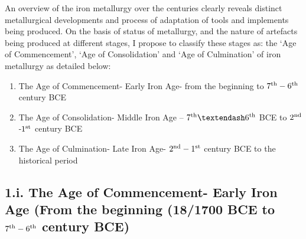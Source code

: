  An overview of the iron metallurgy over the centuries clearly reveals distinct metallurgical developments and process of adaptation of tools and implements being produced. On the basis of status of metallurgy, and the nature of artefacts being produced at different stages, I propose to classify these stages as: the ‘Age of Commencement’, ‘Age of Consolidation’ and ‘Age of Culmination’ of iron metallurgy as detailed below: 
\begin{enumerate}
\item The Age of Commencement- Early Iron Age- from the beginning to $7^{\rm th} -6^{\rm th}$ century BCE
\item The Age of Consolidation- Middle Iron Age – $7^{\rm th} – 6^{\rm th}$ BCE to $2^{\rm nd}$ -$1^{\rm st}$ century BCE
\item The Age of Culmination- Late Iron Age- $2^{\rm nd} -1^{\rm st}$ century BCE to the historical period
\end{enumerate}

\vspace{-.5cm}

\subsection*{1.i. The Age of Commencement- Early Iron Age (From the beginning (18/1700 BCE to $7^{\rm th} -6^{\rm th}$ century BCE)}\label{chapter4-subsection-1}

